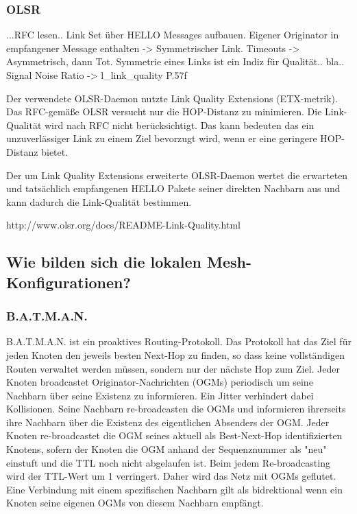\documentclass[a4paper,10pt]{article}
\begin{document}

\subsubsection*{OLSR}

...RFC lesen..
Link Set über HELLO Messages aufbauen. Eigener Originator in 
empfangener Message enthalten -> Symmetrischer Link. Timeouts -> Asymmetrisch, dann Tot.
Symmetrie eines Links ist ein Indiz für Qualität.. bla..
Signal Noise Ratio -> l\_link\_quality P.57f

Der verwendete OLSR-Daemon nutzte Link Quality Extensions (ETX-metrik).
Das RFC-gemäße OLSR versucht nur die HOP-Distanz zu minimieren. Die Link-Qualität
wird nach RFC nicht berücksichtigt. Das kann bedeuten das ein unzuverlässiger Link zu einem Ziel bevorzugt wird,
wenn er eine geringere HOP-Distanz bietet.

Der um Link Quality Extensions erweiterte OLSR-Daemon wertet die erwarteten und tatsächlich empfangenen
HELLO Pakete seiner direkten Nachbarn aus und kann dadurch die Link-Qualität bestimmen.

http://www.olsr.org/docs/README-Link-Quality.html


\subsection{Wie bilden sich die lokalen Mesh-Konfigurationen?}


\subsubsection*{B.A.T.M.A.N.}

B.A.T.M.A.N. ist ein proaktives Routing-Protokoll.
Das Protokoll hat das Ziel für jeden Knoten den jeweils besten Next-Hop zu finden, so dass keine vollständigen Routen verwaltet werden müssen, sondern nur der nächste Hop zum Ziel.
Jeder Knoten broadcastet Originator-Nachrichten (OGMs) periodisch um seine Nachbarn über seine Existenz zu informieren.
Ein Jitter verhindert dabei Kollisionen.
Seine Nachbarn re-broadcasten die OGMs und informieren ihrerseits ihre Nachbarn über die Existenz des eigentlichen Absenders der OGM.
Jeder Knoten re-broadcastet die OGM seines aktuell als Best-Next-Hop identifizierten Knotens, sofern der Knoten die OGM anhand der Sequenznummer als "neu" einstuft und die TTL noch nicht abgelaufen ist.
Beim jedem Re-broadcasting wird der TTL-Wert um 1 verringert.
Daher wird das Netz mit OGMs geflutet.
Eine Verbindung mit einem spezifischen Nachbarn gilt als bidrektional wenn ein Knoten seine eigenen OGMs von diesem Nachbarn empfängt.
\end{document}
